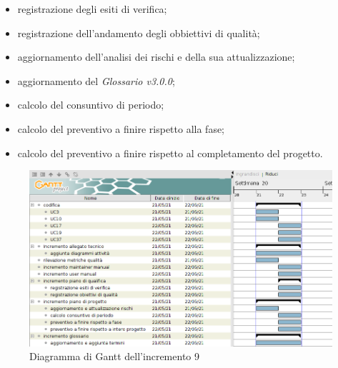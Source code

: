 \begin{itemize}
\begin{itemize}
              \item registrazione degli esiti di verifica;
              \item registrazione dell'andamento degli obbiettivi di qualità;
              \item aggiornamento dell'analisi dei rischi e della sua attualizzazione;
              \item aggiornamento del \textit{Glossario v3.0.0};
              \item calcolo del consuntivo di periodo;
              \item calcolo del preventivo a finire rispetto alla fase;
              \item calcolo del preventivo a finire rispetto al completamento del progetto.
          \end{itemize}
\end{itemize}
\pagebreak
{}
\begin{figure}[!ht]
    \caption{Diagramma di Gantt dell'incremento 9}
    \vspace{5px}
    \includegraphics[scale=0.3]{../../../Images/Diagrammi/Gantt/incremento9.png}
    \centering
\end{figure}

